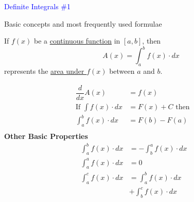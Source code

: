 \documentclass[14pt,fleqn]{extarticle}
\begin{document}
\textcolor{blue}{Definite Integrals \#1}

Basic concepts and most frequently used formulae

\newcard 

If $f(x)$ be a \underline{continuous function} in $[a,b]$,
then 
\[ \qquad A(x) = \int_a^b f(x)\cdot dx \]
represents the \underline{area under $f(x)$} between $a$ and $b$. 

\begin{align}
\dfrac{d}{dx} A(x) &= f(x) \\
\text{If }\int f(x)\cdot dx &= F(x) + C \text{ then } \\[-20pt]
\int_a^b f(x)\cdot dx &= F(b) - F(a) \\  
\end{align}
\textbf{Other Basic Properties} 
\begin{align}
\int_a^b f(x)\cdot dx &= -\int_b^a f(x)\cdot dx \\[-15pt]
\int_a^a f(x)\cdot dx &= 0 \\ 
\int_a^c f(x)\cdot dx &= \int_a^b f(x)\cdot dx \\[-15pt]
&+ \int_b^c f(x)\cdot dx 
\end{align}
\end{document}
